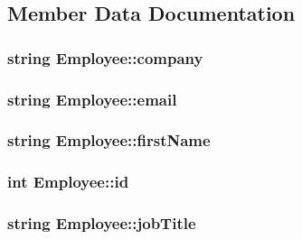 \subsection{Member Data Documentation}
\subsubsection[{\texorpdfstring{company}{company}}]{\setlength{\rightskip}{0pt plus 5cm}string Employee\+::company}\hypertarget{structEmployee_ab1205cf44ecd77432ac49d00024d29d8}{}\label{structEmployee_ab1205cf44ecd77432ac49d00024d29d8}
\subsubsection[{\texorpdfstring{email}{email}}]{\setlength{\rightskip}{0pt plus 5cm}string Employee\+::email}\hypertarget{structEmployee_ad719e003fac9b1e8bb01fe7a59d3fbb2}{}\label{structEmployee_ad719e003fac9b1e8bb01fe7a59d3fbb2}
\subsubsection[{\texorpdfstring{first\+Name}{firstName}}]{\setlength{\rightskip}{0pt plus 5cm}string Employee\+::first\+Name}\hypertarget{structEmployee_a29ffe329a053da230a3047d735b327c6}{}\label{structEmployee_a29ffe329a053da230a3047d735b327c6}
\subsubsection[{\texorpdfstring{id}{id}}]{\setlength{\rightskip}{0pt plus 5cm}int Employee\+::id}\hypertarget{structEmployee_aa3c52ce29b149fa47f0edd9e998833f5}{}\label{structEmployee_aa3c52ce29b149fa47f0edd9e998833f5}
\subsubsection[{\texorpdfstring{job\+Title}{jobTitle}}]{\setlength{\rightskip}{0pt plus 5cm}string Employee\+::job\+Title}\hypertarget{structEmployee_a764e98a4988b58758cdeb8c805b67bc3}{}\label{structEmployee_a764e98a4988b58758cdeb8c805b67bc3}
